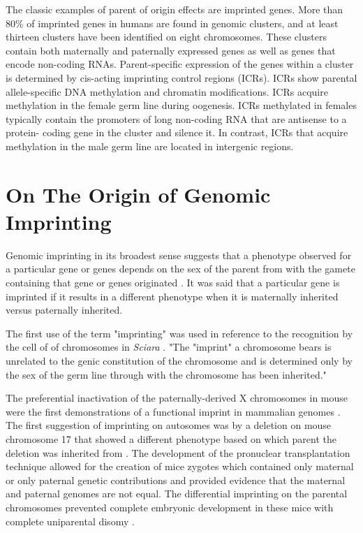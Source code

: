 The classic examples of parent of origin effects are imprinted genes. More than 80\% of imprinted genes in humans are found in genomic clusters, and at least thirteen clusters have been identified on eight chromosomes\cite{Lawson2013,Peters2014,Pires2014,Abramowitz2012}. These clusters contain both maternally and paternally expressed genes as well as genes that encode non-coding RNAs\cite{Peters2014,Abramowitz2012}. Parent-specific expression of the genes within a cluster is determined by cis-acting imprinting control regions (ICRs). ICRs show parental allele-specific DNA methylation and chromatin modifications. ICRs acquire methylation in the female germ line during oogenesis. ICRs methylated in females typically contain the promoters of long non-coding RNA that are antisense to a protein- coding gene in the cluster and silence it. In contrast, ICRs that acquire methylation in the male germ line are located in intergenic regions.


\section{On The Origin of Genomic Imprinting }

Genomic imprinting in its broadest sense suggests that a phenotype observed for a particular gene or genes depends on the sex of the parent from with the gamete containing that gene or genes originated \cite{Sapienza:1989vm}. It was said that a particular gene is imprinted if it results in a different phenotype when it is maternally inherited versus paternally inherited.

The first use of the term "imprinting" was used in reference to the recognition by the cell of of chromosomes in \textit{Sciara} \cite{Crouse:1960vc,Sapienza:1989vm}. "The "imprint" a chromosome bears is unrelated to the genic constitution of the chromosome and is determined only by the sex of the germ line through with the chromosome has been inherited." \cite{Crouse:1960vc} 

The preferential inactivation of the paternally-derived X chromosomes in mouse were the first demonstrations of a functional imprint in mammalian genomes \cite{Takagi:1975ua,Lyon:1984gh,Chandra:1975tb}. The first suggestion of imprinting on autosomes was by a deletion on mouse chromosome 17 that showed a different phenotype based on which parent the deletion was inherited from \cite{Johnson:1974uf,Johnson:1974kc}. The development of the pronuclear transplantation technique allowed for the creation of mice zygotes which contained only maternal or only paternal genetic contributions and provided evidence that the maternal and paternal genomes are not equal. The differential imprinting on the parental chromosomes prevented complete embryonic development in these mice with complete uniparental disomy \cite{Sapienza:1989vm,McGrath:1984ky}. 

